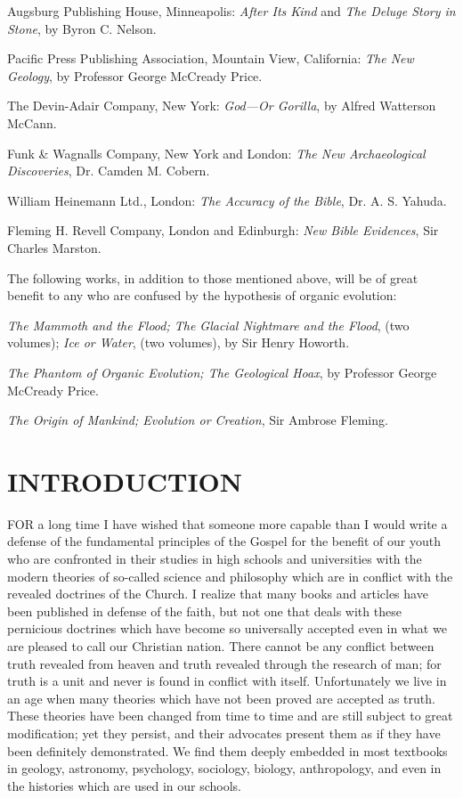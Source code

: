 Augsburg Publishing House, Minneapolis: \textit{After Its Kind} and \textit{The Deluge Story in Stone}, by
Byron C. Nelson.

Pacific Press Publishing Association, Mountain View, California: \textit{The New Geology}, by
Professor George McCready Price.

The Devin-Adair Company, New York: \textit{God—Or Gorilla}, by Alfred Watterson McCann.

Funk \& Wagnalls Company, New York and London: \textit{The New Archaeological Discoveries},
Dr. Camden M. Cobern.

William Heinemann Ltd., London: \textit{The Accuracy of the Bible}, Dr. A. S. Yahuda.

Fleming H. Revell Company, London and Edinburgh: \textit{New Bible Evidences}, Sir Charles
Marston.

The following works, in addition to those mentioned above, will be of great benefit to any
who are confused by the hypothesis of organic evolution:

\textit{The Mammoth and the Flood; The Glacial Nightmare and the Flood}, (two volumes); \textit{Ice or
Water}, (two volumes), by Sir Henry Howorth.

\textit{The Phantom of Organic Evolution; The Geological Hoax}, by Professor George McCready
Price.

\textit{The Origin of Mankind; Evolution or Creation}, Sir Ambrose Fleming.

\newpage
\section{INTRODUCTION}

FOR a long time I have wished that someone more capable than I would write a defense of
the fundamental principles of the Gospel for the benefit of our youth who are confronted in
their studies in high schools and universities with the modern theories of so-called science
and philosophy which are in conflict with the revealed doctrines of the Church. I realize that
many books and articles have been published in defense of the faith, but not one that deals
with these pernicious doctrines which have become so universally accepted even in what we
are pleased to call our Christian nation. There cannot be any conflict between truth revealed
from heaven and truth revealed through the research of man; for truth is a unit and never is
found in conflict with itself. Unfortunately we live in an age when many theories which have
not been proved are accepted as truth. These theories have been changed from time to time
and are still subject to great modification; yet they persist, and their advocates present them
as if they have been definitely demonstrated. We find them deeply embedded in most
textbooks in geology, astronomy, psychology, sociology, biology, anthropology, and even in
the histories which are used in our schools.


